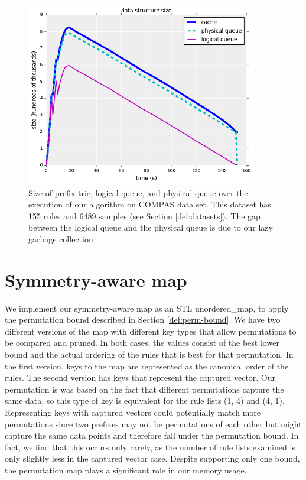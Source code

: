 \begin{figure}[t!]
\begin{center}
\includegraphics[width=0.9\textwidth]{figs/compas-queue-cache-size-insertions.png}
\end{center}
\caption{Size of prefix trie, logical queue, and physical queue over the execution of our algorithm on COMPAS data set.
This dataset has 155 rules and 6489 samples (see Section \ref{def:datasets}).
The gap between the logical queue and the physical queue is due to our lazy garbage collection}
\label{fig:queue_gc}
\end{figure}

\section{Symmetry-aware map}
We implement our symmetry-aware map as an STL unordered\_map, to apply the permutation bound described in Section \ref{def:perm-bound}.
We have two different versions of the map with different key types that allow permutations to be compared and pruned.
In both cases, the values consist of the best lower bound and the actual ordering of the rules that is best for that permutation.
In the first version, keys to the map are represented as the canonical order of the rules.
The second version has keys that represent the captured vector.
Our permutation is was based on the fact that different permutations capture the same data, so this type of key is equivalent for the rule lists (1, 4) and (4, 1).
Representing keys with captured vectors could potentially match more permutations since two prefixes may not be permutations of each other but might capture the same data points and therefore fall under the permutation bound.
In fact, we find that this occurs only rarely, as the number of rule lists examined is only slightly less in the captured vector case.
Despite supporting only one bound, the permutation map plays a significant role in our memory usage.

